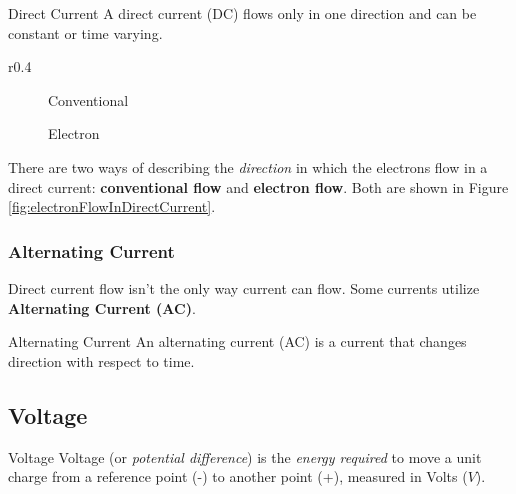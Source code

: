\documentclass[12pt]{article}
\begin{document}
\begin{definition}{Direct Current}
  A direct current (DC) flows only in one direction and can be constant or time varying.
\end{definition}

\begin{wrapfigure}[5]{r}{0.4\textwidth}
  \centering
  \begin{subfigure}[H]{0.15\textwidth}
    \centering
    
    \caption{Conventional}
    \label{fig:001}
  \end{subfigure}
  \begin{subfigure}[H]{0.15\textwidth}
    \centering
    
    \caption{Electron}
    \label{fig:002}
  \end{subfigure}
  \caption{Electron Flow in Direct Currents}
  \label{fig:electronFlowInDirectCurrent}
\end{wrapfigure}

There are two ways of describing the \textit{direction} in which the electrons flow in a direct current: \textbf{conventional flow} and \textbf{electron flow}. Both are shown in Figure \ref{fig:electronFlowInDirectCurrent}.

\subsubsection{Alternating Current}
\label{sssec:alternatingCurrent}

Direct current flow isn't the only way current can flow. Some currents utilize \textbf{Alternating Current (AC)}.

\begin{definition}{Alternating Current}
  An alternating current (AC) is a current that changes direction with respect to time.
\end{definition}

\subsection{Voltage}
\label{ssec:voltage}

\begin{definition}{Voltage}
  Voltage (or \textit{potential difference}) is the \textit{energy required} to move a unit charge from a reference point (-) to another point (+), measured in Volts ($V$).
\end{definition}
\end{document}
